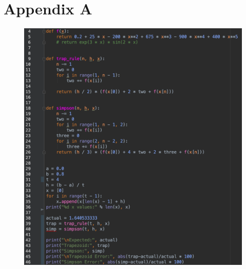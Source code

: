 \documentclass[12pt, letterpaper]{article}
\begin{document}
\pagebreak
\appendix
	\section{Appendix A}
            	\begin{figure}[h]
            		\centering
            		\includegraphics[width=1.0\linewidth]{PythonCode.png}
            	\end{figure}
		
		
		
\end{document}
